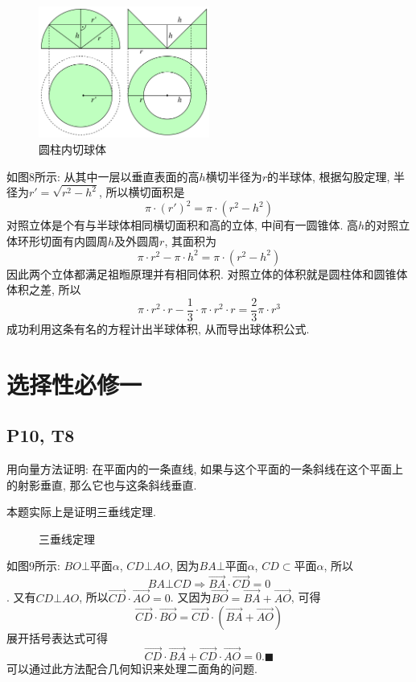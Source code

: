 \documentclass{book}
\begin{document}
        \begin{figure}[htbp]
            \centering
            \includegraphics[width=0.5\textwidth]{img/Cavalieri_half-ball.svg.png}
            \caption{圆柱内切球体}
        \end{figure}

        如图8所示: 从其中一层以垂直表面的高$h$横切半径为$r$的半球体, 根据勾股定理, 半径为${\displaystyle r'={\sqrt {r^{2}-h^{2}}}}$, 所以横切面积是$${\displaystyle \pi \cdot (r')^{2}=\pi \cdot (r^{2}-h^{2})}$$对照立体是个有与半球体相同横切面积和高的立体, 中间有一圆锥体. 高$h$的对照立体环形切面有内圆周$h$及外圆周$r$, 其面积为$${\displaystyle \pi \cdot r^{2}-\pi \cdot h^{2}=\pi \cdot (r^{2}-h^{2})}$$因此两个立体都满足祖暅原理并有相同体积. 对照立体的体积就是圆柱体和圆锥体体积之差, 所以$${\displaystyle \pi \cdot r^{2}\cdot r-{\frac {1}{3}}\cdot \pi \cdot r^{2}\cdot r={\frac {2}{3}}\pi \cdot r^{3}}$$成功利用这条有名的方程计出半球体积, 从而导出球体积公式. 

        \chapter{选择性必修一}
        \section{\textcolor[rgb]{0.11,0.65,0.52}{P10, T8}}
        \begin{boxB}
            用向量方法证明: 在平面内的一条直线, 如果与这个平面的一条斜线在这个平面上的射影垂直, 那么它也与这条斜线垂直.
        \end{boxB}
        本题实际上是证明\textcolor[rgb]{0.38,0.11,0.2}{三垂线定理}.

        
        \begin{figure}[htbp]
            \centering
            
            \caption{三垂线定理}
        \end{figure}
        如图9所示: $BO \bot $平面$\alpha$, $CD\bot AO$, 因为$BA \bot $平面$\alpha$, $CD\subset $平面$\alpha$, 所以$$BA\bot CD\Longrightarrow \overrightarrow{BA}\cdot \overrightarrow{CD}=0$$.
        又有$CD\bot AO$, 所以$\overrightarrow{CD}\cdot \overrightarrow{AO}=0$.
        又因为$\overrightarrow{BO}=\overrightarrow{BA}+\overrightarrow{AO}$, 可得$$\overrightarrow{CD}\cdot\overrightarrow{BO}=\overrightarrow{CD}\cdot\left( \overrightarrow{BA}+\overrightarrow{AO} \right)$$
        展开括号表达式可得$$\overrightarrow{CD}\cdot\overrightarrow{BA}+\overrightarrow{CD}\cdot\overrightarrow{AO}=0. \blacksquare$$
        可以通过此方法配合几何知识来处理二面角的问题.
\end{document}
